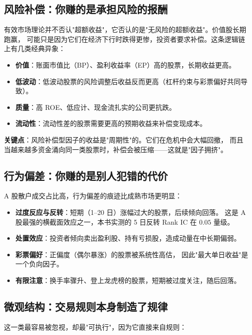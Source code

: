 \subsection{风险补偿：你赚的是承担风险的报酬}

有效市场理论并不否认"超额收益"，它否认的是"无风险的超额收益"。价值股长期跑赢，
可能只是因为它们在经济下行时跌得更惨，投资者要求补偿。这条逻辑链上有几类经典异象：

\begin{itemize}
  \item \textbf{价值}：账面市值比（BP）、盈利收益率（EP）高的股票，长期收益更高。
  \item \textbf{低波动}：低波动股票的风险调整后收益反而更高（杠杆约束与彩票偏好共同导致）。
  \item \textbf{质量}：高 ROE、低应计、现金流扎实的公司更抗跌。
  \item \textbf{流动性}：流动性差的股票需要更高的预期收益来补偿变现成本。
\end{itemize}

\textbf{关键点}：风险补偿型因子的收益是"周期性"的。它们在危机中会大幅回撤，
而且当越来越多资金涌向同一类股票时，补偿会被压缩——这就是"因子拥挤"。

\subsection{行为偏差：你赚的是别人犯错的代价}

A 股散户成交占比高，行为偏差的痕迹比成熟市场更明显：

\begin{itemize}
  \item \textbf{过度反应与反转}：短期（1--20 日）涨幅过大的股票，后续倾向回落。
        这是 A 股最强的横截面效应之一，本书实测的 5 日反转 Rank IC 在 $0.05$ 量级。
  \item \textbf{处置效应}：投资者倾向卖出盈利股、持有亏损股，造成动量在中长期偏弱。
  \item \textbf{彩票偏好}：正偏度（偶尔暴涨）的股票被系统性高估，
        因此"最大单日收益"是一个负向因子。
  \item \textbf{有限注意}：换手率骤升、登上龙虎榜的股票，短期被过度关注，随后回落。
\end{itemize}

\subsection{微观结构：交易规则本身制造了规律}

这一类最容易被忽视，却最"可执行"，因为它直接来自规则：

